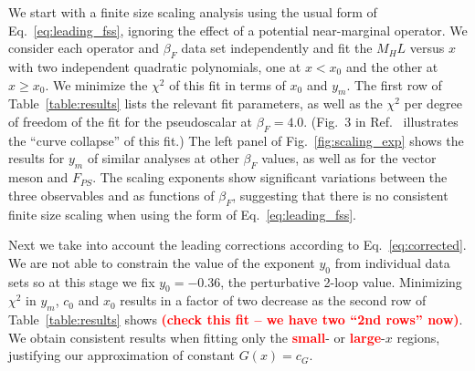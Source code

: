 \documentclass[prl, letterpaper, amsmath, amssymb, preprintnumbers, showpacs, superscriptaddress, twocolumn]{revtex4-1}
\newcommand{\be}{\ensuremath{\beta} }
\newcommand{\refcite}[1]{Ref.~\cite{#1}}
\newcommand{\eq}[1]{Eq.~\ref{#1}}
\newcommand{\fig}[1]{Fig.~\ref{#1}}
\newcommand{\TODO}[1]{\textcolor{red}{{\bf #1}}}
\begin{document}
We start with a finite size scaling analysis using the usual form of \eq{eq:leading_fss}, ignoring the effect of a potential near-marginal operator.
We consider each operator and $\be_F$ data set independently and fit the $M_H L$ versus $x$ with two independent quadratic polynomials, one at $x<x_0$ and the other at $x\ge x_0$.
We minimize the $\chi^2$ of this fit in terms of $x_0$ and $y_m$.
The first row of Table~\ref{table:results} lists the relevant fit parameters, as well as the $\chi^2$ per degree of freedom of the fit for the pseudoscalar at $\be_F = 4.0$.
(Fig.~3 in \refcite{Hasenfratz:2013eka} illustrates the ``curve collapse'' of this fit.)
The left panel of \fig{fig:scaling_exp} shows the results for $y_m$ of similar analyses at other $\be_F$ values, as well as for the vector meson and $F_{PS}$.
The scaling exponents show significant variations between the three observables and as functions of $\be_F$, suggesting that there is no consistent finite size scaling when using the form of \eq{eq:leading_fss}.

Next we take into account the leading corrections according to \eq{eq:corrected}.
We are not able to constrain the value of the exponent $y_0$ from individual data sets so at this stage we fix $y_0 = -0.36$, the perturbative 2-loop value.
Minimizing $\chi^2$ in $y_m$, $c_0$ and $x_0$ results in a factor of two decrease as the second row of Table~\ref{table:results} shows \TODO{(check this fit -- we have two ``2nd rows'' now)}.
We obtain consistent results when fitting only the \TODO{small}- or \TODO{large}-$x$ regions, justifying our approximation of constant $G(x) = c_G$. %
\end{document}
